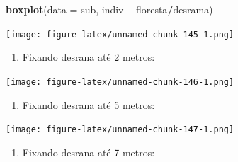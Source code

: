 \documentclass[
]{article}
\newenvironment{Shaded}{\begin{snugshade}}{\end{snugshade}}
\newcommand{\DataTypeTok}[1]{\textcolor[rgb]{0.13,0.29,0.53}{#1}}
\newcommand{\DecValTok}[1]{\textcolor[rgb]{0.00,0.00,0.81}{#1}}
\newcommand{\KeywordTok}[1]{\textcolor[rgb]{0.13,0.29,0.53}{\textbf{#1}}}
\newcommand{\NormalTok}[1]{#1}
\newcommand{\OperatorTok}[1]{\textcolor[rgb]{0.81,0.36,0.00}{\textbf{#1}}}
\newcommand{\StringTok}[1]{\textcolor[rgb]{0.31,0.60,0.02}{#1}}
\providecommand{\tightlist}{%
  \setlength{\itemsep}{0pt}\setlength{\parskip}{0pt}}
\begin{document}
\begin{Shaded}
\begin{Highlighting}[]
\KeywordTok{boxplot}\NormalTok{(}\DataTypeTok{data =}\NormalTok{ sub, indiv }\OperatorTok{~}\StringTok{ }\NormalTok{floresta}\OperatorTok{/}\NormalTok{desrama)}
\end{Highlighting}
\end{Shaded}

\texttt{[image: figure-latex/unnamed-chunk-145-1.png]}

\begin{enumerate}
\def\labelenumi{\arabic{enumi}.}
\setcounter{enumi}{3}
\tightlist
\item
  Fixando desrana até 2 metros:
\end{enumerate}

\begin{Shaded}
\end{Shaded}

\texttt{[image: figure-latex/unnamed-chunk-146-1.png]}

\begin{enumerate}
\def\labelenumi{\arabic{enumi}.}
\setcounter{enumi}{4}
\tightlist
\item
  Fixando desrana até 5 metros:
\end{enumerate}

\begin{Shaded}
\end{Shaded}

\texttt{[image: figure-latex/unnamed-chunk-147-1.png]}

\begin{enumerate}
\def\labelenumi{\arabic{enumi}.}
\setcounter{enumi}{5}
\tightlist
\item
  Fixando desrana até 7 metros:
\end{enumerate}
\end{document}
